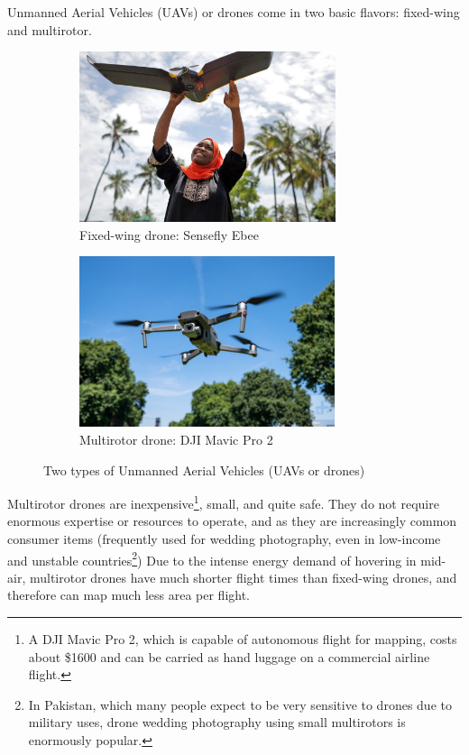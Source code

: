 \documentclass[a4paper,12pt,twoside]{article}
\begin{document}
Unmanned Aerial Vehicles (UAVs) or drones come in two basic flavors: fixed-wing and multirotor. 

\begin{figure}[H]
\begin{subfigure}{0.5\textwidth}
\includegraphics[width=0.9\linewidth, height=5cm]{images/Zanzibar_ebee.jpg} 
\caption{Fixed-wing drone: Sensefly Ebee}
\label{fig:subim1}
\end{subfigure}
\begin{subfigure}{0.5\textwidth}
\includegraphics[width=0.9\linewidth, height=5cm]{images/dji-mavic-2-pro.jpg}
\caption{Multirotor drone: DJI Mavic Pro 2}
\label{fig:subim2}
\end{subfigure}
\caption{Two types of Unmanned Aerial Vehicles (UAVs or drones)}
\label{fig:image2}
\end{figure}


Multirotor drones are inexpensive\footnote{A DJI Mavic Pro 2, which is capable of autonomous flight for mapping, costs about \$1600 and can be carried as hand luggage on a commercial airline flight.}, small, and quite safe. They do not require enormous expertise or resources to operate, and as they are increasingly common consumer items (frequently used for wedding photography, even in low-income and unstable countries\footnote{In Pakistan, which many people expect to be very sensitive to drones due to military uses, drone wedding photography using small multirotors is enormously popular.}) Due to the intense energy demand of hovering in mid-air, multirotor drones have much shorter flight times than fixed-wing drones, and therefore can map much less area per flight.
\end{document}
